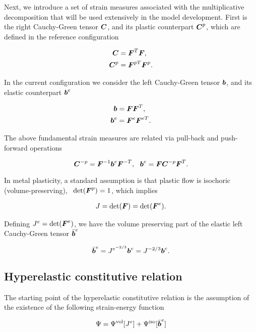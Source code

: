Next, we introduce a set of strain measures associated with the
multiplicative decomposition that will be used extensively in the
model development. First is the right Cauchy-Green tensor ${\boldsymbol{C}}$, and
its plastic counterpart ${\boldsymbol{C}}^p$, which are defined in the reference configuration

\begin{align}
  {\boldsymbol{C}} &= {\boldsymbol{F}}^T {\boldsymbol{F}},\\
  {\boldsymbol{C}}^p &= {\boldsymbol{F}}^{pT} {\boldsymbol{F}}^p.
\end{align}

In the current configuration we consider the left
Cauchy-Green tensor ${\boldsymbol{b}}$, and its elastic counterpart ${{\boldsymbol{b}}}^e$

\begin{align}
  {\boldsymbol{b}} &= {\boldsymbol{F}} {\boldsymbol{F}}^{T},\\
  {\boldsymbol{b}}^e &= {\boldsymbol{F}}^e {\boldsymbol{F}}^{eT}.\label{eq:be}\\
\end{align}

The above fundamental strain measures are related via pull-back and
push-forward operations

\begin{equation}\label{eq:pullpush}
  {\boldsymbol{C}}^{-p} ={\boldsymbol{F}}^{-1} {\boldsymbol{b}}^e {\boldsymbol{F}}^{-T},~~{\boldsymbol{b}}^e = {\boldsymbol{F}} {\boldsymbol{C}}^{-p} {\boldsymbol{F}}^T.
\end{equation}

In metal plasticity, a standard assumption is that plastic flow
is isochoric (volume-preserving), \ie\ $\det({\boldsymbol{F}}^p)=1$, which implies

\begin{align}
  J = \det ({\boldsymbol{F}}) = \det ({\boldsymbol{F}}^e).
\end{align}

Defining $J^e=\det({\boldsymbol{F}}^e)$, we have the volume preserving part of the
elastic left Cauchy-Green tensor $\bar{{\boldsymbol{b}}}^e$

\begin{equation}
  \bar{{\boldsymbol{b}}}^e = J^{e^{-2/3}}{\boldsymbol{b}}^e = J^{-2/3}{\boldsymbol{b}}^e.
\end{equation}

\subsection{Hyperelastic constitutive relation}

The starting point of the hyperelastic constitutive relation is the assumption of the existence of the following strain-energy function

\begin{equation}
\Psi=\Psi^{\rm vol}[J^e] + \Psi^{\rm iso}[\bar{{\boldsymbol{b}}}^e]
\end{equation}

